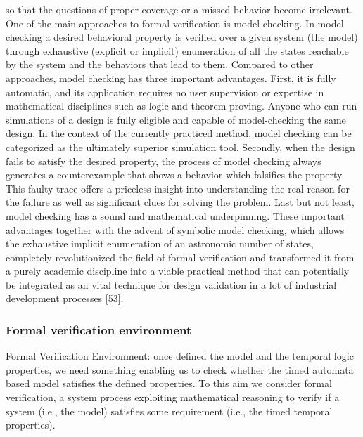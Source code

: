 \documentclass{article}
\begin{document}
		so that the questions of proper coverage or a missed behavior become irrelevant.
		One of the main approaches to formal verification is model checking. In model checking
		a desired behavioral property is verified over a given system (the model) through exhaustive
		(explicit or implicit) enumeration of all the states reachable by the system and the behaviors
		that lead to them. Compared to other approaches, model checking has three important
		advantages. First, it is fully automatic, and its application requires no user supervision
		or expertise in mathematical disciplines such as logic and theorem proving. Anyone who
		can run simulations of a design is fully eligible and capable of model-checking the same
		design. In the context of the currently practiced method, model checking can be categorized
		as the ultimately superior simulation tool. Secondly, when the design fails to satisfy the
		desired property, the process of model checking always generates a counterexample that
		shows a behavior which falsifies the property. This faulty trace offers a priceless insight
		into understanding the real reason for the failure as well as significant clues for solving the
		problem. Last but not least, model checking has a sound and mathematical underpinning.
		These important advantages together with the advent of symbolic model checking, which
		allows the exhaustive implicit enumeration of an astronomic number of states, completely
		revolutionized the field of formal verification and transformed it from a purely academic
		discipline into a viable practical method that can potentially be integrated as an vital
		technique for design validation in a lot of industrial development processes [53].
		
		\subsubsection{Formal  verification environment}
		Formal Verification Environment: once defined the model
		and the temporal logic properties, we need something enabling
		us to check whether the timed automata based model satisfies
		the defined properties. To this aim we consider formal verification,
		a system process exploiting mathematical reasoning to
		verify if a system (i.e., the model) satisfies some requirement
		(i.e., the timed temporal properties).
		
\end{document}
